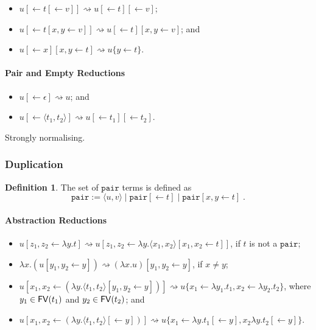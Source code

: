 \documentclass[11pt,a4paper]{article}
\theoremstyle{definition}
\newtheorem{definition}{Definition}
\theoremstyle{plain}
\theoremstyle{remark}
\begin{document}
\begin{itemize}
	\item $u[\leftarrow t[\leftarrow v]]\rightsquigarrow u[\leftarrow t][\leftarrow v]$;
	\item $u[\leftarrow t[x,y\leftarrow v]]\rightsquigarrow u[\leftarrow t][x,y\leftarrow v]$; and
	\item $u[\leftarrow x][x,y\leftarrow t]\rightsquigarrow u\{y\leftarrow t\}$.
\end{itemize}

\paragraph{Pair and Empty Reductions}

\begin{itemize}
	\item $u[\leftarrow\epsilon]\rightsquigarrow u$; and
	\item $u[\leftarrow\langle t_1,t_2\rangle]\rightsquigarrow u[\leftarrow t_1][\leftarrow t_2]$.
\end{itemize}

Strongly normalising.

\subsubsection{Duplication}

\newcommand{\tpair}{{\mathtt{pair}}}

\begin{definition}
	The set of $\tpair$ terms is defined as
	\[\tpair:=\langle u,v\rangle\;|\;\tpair[\leftarrow t]\;|\;\tpair[x,y\leftarrow t]\;.\]
\end{definition}

\paragraph{Abstraction Reductions}

\begin{itemize}
	\item $u[z_1,z_2\leftarrow\lambda y.t]\rightsquigarrow u[z_1,z_2\leftarrow\lambda y.\langle x_1,x_2\rangle[x_1,x_2\leftarrow t]]$, if $t$ is not a $\tpair$;
	\item $\lambda x.(u[y_1,y_2\leftarrow y])\rightsquigarrow (\lambda x.u)[y_1,y_2\leftarrow y]$, if $x\neq y$;
	\item $u[x_1,x_2\leftarrow(\lambda y.\langle t_1,t_2\rangle[y_1,y_2\leftarrow y])]\rightsquigarrow u\{x_1\leftarrow\lambda y_1.t_1,x_2\leftarrow\lambda y_2.t_2\}$, where $y_1\in{\mathop{\mathsf{FV}}}(t_1)$ and $y_2\in{\mathop{\mathsf{FV}}}(t_2)$; and
	\item $u[x_1,x_2\leftarrow(\lambda y.\langle t_1,t_2\rangle[\leftarrow y])]\rightsquigarrow u\{x_1\leftarrow\lambda y.t_1[\leftarrow y],x_2\lambda y.t_2[\leftarrow y]\}$.
\end{itemize}
\end{document}
